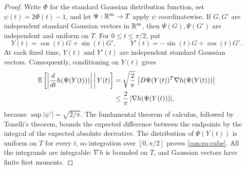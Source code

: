 \begin{proof}
Write $\Phi$ for the standard Gaussian distribution function, set
$\psi(t)=2\Phi(t)-1$, and let $\Psi:\mathbb R^m\to T$ apply $\psi$
coordinatewise. If $G,G'$ are independent standard Gaussian vectors in
$\mathbb R^m$, then $\Psi(G),\Psi(G')$ are independent and uniform on $T$.
For $0\le t\le\pi/2$, put
\[
  Y(t)=\cos(t)G+\sin(t)G',
  \qquad
  Y'(t)=-\sin(t)G+\cos(t)G'.
\]
At each fixed time, $Y(t)$ and $Y'(t)$ are independent standard Gaussian
vectors. Consequently, conditioning on $Y(t)$ gives
\begin{align*}
  \mathbb E\left[\left|\frac{d}{dt}h(\Psi(Y(t)))\right|
      \,\middle|\,Y(t)\right]
  &=\sqrt{\frac{2}{\pi}}\,
    \left|D\Psi(Y(t))^{T}\nabla h(\Psi(Y(t)))\right|\\
  &\le \frac{2}{\pi}\,|\nabla h(\Psi(Y(t)))|,
\end{align*}
because $\sup|\psi'|=\sqrt{2/\pi}$. The fundamental theorem of calculus,
followed by Tonelli's theorem, bounds the expected difference between the
endpoints by the integral of the expected absolute derivative. The
distribution of $\Psi(Y(t))$ is uniform on $T$ for every $t$, so integration
over $[0,\pi/2]$ proves \eqref{con:eq:cube}. All the integrands are
integrable: $\nabla h$ is bounded on $\overline T$, and Gaussian vectors have
finite first moments.
\end{proof}

